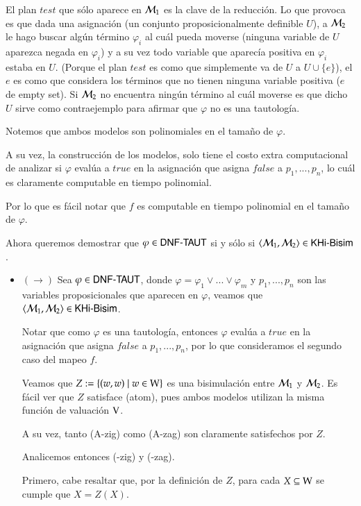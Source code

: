 \begin{demostracion}
    El plan $test$ que sólo aparece en $\mathcal{M}_1$ es la clave de la reducción. Lo que provoca es que dada una asignación (un conjunto proposicionalmente definible $U$), a $\mathcal{M}_2$ le hago buscar algún término $\varphi_i$ al cuál pueda moverse (ninguna variable de $U$ aparezca negada en $\varphi_i$) y a su vez todo variable que aparecía positiva en $\varphi_i$ estaba en $U$. (Porque el plan $test$ es como que simplemente va de $U$ a $U \cup \{e\}$), el $e$ es como que considera los términos que no tienen ninguna variable positiva ($e$ de empty set). Si $\mathcal{M}_2$ no encuentra ningún término al cuál moverse es que dicho $U$ sirve como contraejemplo para afirmar que $\varphi$ no es una tautología.

\medskip\medskip
        
    Notemos que ambos modelos son polinomiales en el tamaño de $\varphi$.

    A su vez, la construcción de los modelos, solo tiene el costo extra computacional de analizar si $\varphi$ evalúa a $true$ en la asignación que asigna $false$ a $p_1,...,p_n$, lo cuál es claramente computable en tiempo polinomial.

    Por lo que es fácil notar que $f$ es computable en tiempo polinomial en el tamaño de $\varphi$.

    Ahora queremos demostrar que $\varphi \in \rm\textsf{DNF-TAUT}$ si y sólo si $\langle \mathcal{M}_1,\mathcal{M}_2 \rangle \in \rm\textsf{KHi-Bisim}$.
    \begin{itemize}

    \item $(\rightarrow)$ Sea $\varphi \in \rm\textsf{DNF-TAUT}$, donde $\varphi = \varphi_1 \vee ... \vee \varphi_m$ y $p_1,...,p_n$ son las variables proposicionales que aparecen en $\varphi$, veamos que $\langle \mathcal{M}_1,\mathcal{M}_2 \rangle \in \rm\textsf{KHi-Bisim}$.

    Notar que como $\varphi$ es una tautología, entonces $\varphi$ evalúa a $true$ en la asignación que asigna $false$ a $p_1,...,p_n$, por lo que consideramos el segundo caso del mapeo $f$. 

    Veamos que $Z := \{(w,w) \mid w \in \mathrm{W} \}$ es una bisimulación entre $\mathcal{M}_1$ y $\mathcal{M}_2$. Es fácil ver que $Z$ satisface (atom), pues ambos modelos utilizan la misma función de valuación $\mathrm{V}$.

    A su vez, tanto (A-zig) como (A-zag) son claramente satisfechos por $Z$.

    Analicemos entonces (\KHilogic-zig) y (\KHilogic-zag).

    Primero, cabe resaltar que, por la definición de $Z$, para cada $X \subseteq \mathrm{W}$ se cumple que $X = Z(X)$.


\end{itemize}
\end{demostracion}
